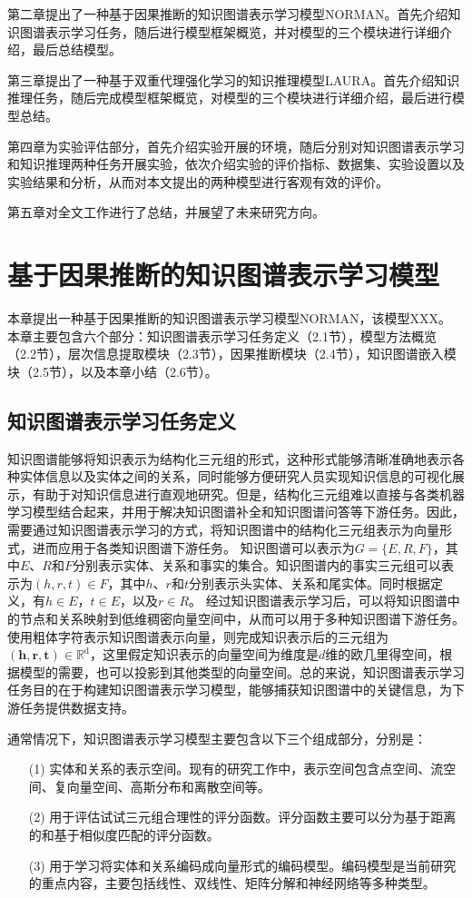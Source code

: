 \documentclass[algorithmlist, AutoFakeBold, AutoFakeSlant, figurelist, tablelist, nomlist, masters]{seuthesix}
\begin{document}
第二章提出了一种基于因果推断的知识图谱表示学习模型NORMAN。首先介绍知识图谱表示学习任务，随后进行模型框架概览，并对模型的三个模块进行详细介绍，最后总结模型。

第三章提出了一种基于双重代理强化学习的知识推理模型LAURA。首先介绍知识推理任务，随后完成模型框架概览，对模型的三个模块进行详细介绍，最后进行模型总结。

第四章为实验评估部分，首先介绍实验开展的环境，随后分别对知识图谱表示学习和知识推理两种任务开展实验，依次介绍实验的评价指标、数据集、实验设置以及实验结果和分析，从而对本文提出的两种模型进行客观有效的评价。

第五章对全文工作进行了总结，并展望了未来研究方向。


\chapter{基于因果推断的知识图谱表示学习模型}
本章提出一种基于因果推断的知识图谱表示学习模型NORMAN，该模型XXX。
本章主要包含六个部分：知识图谱表示学习任务定义（2.1节），模型方法概览（2.2节），层次信息提取模块（2.3节），因果推断模块（2.4节），知识图谱嵌入模块（2.5节），以及本章小结（2.6节）。

\section{知识图谱表示学习任务定义}
知识图谱能够将知识表示为结构化三元组的形式，这种形式能够清晰准确地表示各种实体信息以及实体之间的关系，同时能够方便研究人员实现知识信息的可视化展示，有助于对知识信息进行直观地研究。但是，结构化三元组难以直接与各类机器学习模型结合起来，并用于解决知识图谱补全和知识图谱问答等下游任务。因此，需要通过知识图谱表示学习的方式，将知识图谱中的结构化三元组表示为向量形式，进而应用于各类知识图谱下游任务。
知识图谱可以表示为$G=\{E, R, F\}$，其中$E$、$R$和$F$分别表示实体、关系和事实的集合。知识图谱内的事实三元组可以表示为$(h, r, t) \in F$，其中$h$、$r$和$t$分别表示头实体、关系和尾实体。同时根据定义，有$h \in E$，$t \in E$，以及$r \in R$。
经过知识图谱表示学习后，可以将知识图谱中的节点和关系映射到低维稠密向量空间中，从而可以用于多种知识图谱下游任务。使用粗体字符表示知识图谱表示向量，则完成知识表示后的三元组为$\left(\bm{h}, \bm{r}, \bm{t}\right) \in \mathbb{R}^{\mathrm{d}}$，这里假定知识表示的向量空间为维度是$d$维的欧几里得空间，根据模型的需要，也可以投影到其他类型的向量空间。总的来说，知识图谱表示学习任务目的在于构建知识图谱表示学习模型，能够捕获知识图谱中的关键信息，为下游任务提供数据支持。

通常情况下，知识图谱表示学习模型主要包含以下三个组成部分，分别是：
\begin{itemize}
  \item [(1)] 实体和关系的表示空间。现有的研究工作中，表示空间包含点空间、流空间、复向量空间、高斯分布和离散空间等。
  \item [(2)] 用于评估试试三元组合理性的评分函数。评分函数主要可以分为基于距离的和基于相似度匹配的评分函数。
  \item [(3)] 用于学习将实体和关系编码成向量形式的编码模型。编码模型是当前研究的重点内容，主要包括线性、双线性、矩阵分解和神经网络等多种类型。
\end{itemize}
\end{document}
